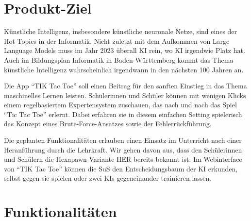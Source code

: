 \documentclass[titlepage]{scrartcl}
\title{\TicTacToe}
\subtitle{Product Backlog}
\date{Stand: \today}
\author{Jonas, Luis, Leonid}
\newcommand{\TicTacToe}{TI\reflectbox K Tac Toe}
\begin{document}
\maketitle

%

\section{Produkt-Ziel}%
Künstliche Intelligenz, insbesondere künstliche neuronale Netze, sind eines der Hot Topics in der Informatik.
Nicht zuletzt mit dem Aufkommen von Large Language Models muss im Jahr 2023 überall KI rein, wo KI irgendwie Platz hat.
Auch im Bildungsplan Informatik in Baden-Württemberg kommt das Thema künstliche Intelligenz wahrscheinlich irgendwann in den nächsten 100 Jahren an.

Die App "`\TicTacToe"' soll einen Beitrag für den sanften Einstieg in das Thema maschinelles Lernen leisten.
Schülerinnen und Schüler können mit wenigen Klicks einem regelbasiertem Expertensystem zuschauen, das nach und nach das Spiel "`Tic Tac Toe"' erlernt.
Dabei erfahren sie in diesem einfachen Setting spielerisch das Konzept eines Brute-Force-Ansatzes sowie der Fehlerrückführung.

Die geplanten Funktionalitäten erlauben einen Einsatz im Unterricht nach einer Heranführung durch die Lehrkraft.
Wir gehen davon aus, dass den Schülerinnen und Schülern die Hexapawn-Variante HER bereits bekannt ist.
Im Webinterface von "`\TicTacToe"' können die SuS den Entscheidungsbaum der KI erkunden, selbst gegen sie spielen oder zwei KIs gegeneinander trainieren lassen.



\section{Funktionalitäten}%
\end{document}

